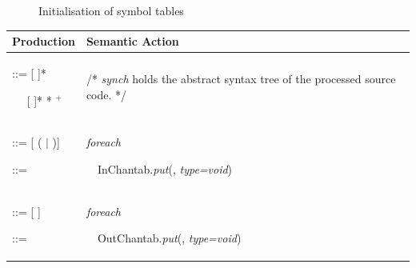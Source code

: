 \begin{figure}[h!]
\noindent{}
\caption{Initialisation of symbol tables\label{symtab_init}}
\end{figure}



\begin{table}
\def\arraystretch{2} 
\begin{tabular*}{1\textwidth}{p{}|p{}}
\hline
Production & Semantic Action\\

\hline

\parbox{0.5\textwidth}{
 ::=   \tangled{(}  [\tangled{,} ]*

~~\tangled{|}  [\tangled{,} ]* \tangled{)} \tangled{\{} * $^+$ \tangled{\}}
} & \parbox{0.5\textwidth}{
/* \emph{synch} holds the abstract syntax tree of the processed source code.  */
}\\

\hline

\parbox{0.5\textwidth}{
 ::=  [\tangled{:} ( $\mid$ )]

 ::= 
} & \parbox{0.5\textwidth}{
\emph{foreach} 

~~InChantab.\emph{put}(, \emph{type=void})
}\\

\hline

\parbox{0.5\textwidth}{
 ::=  [\tangled{:} ]

 ::= 
} & \parbox{0.5\textwidth}{
\emph{foreach} 

~~OutChantab.\emph{put}(, \emph{type=void})
}\\

\hline


\end{tabular*}
\end{table}
